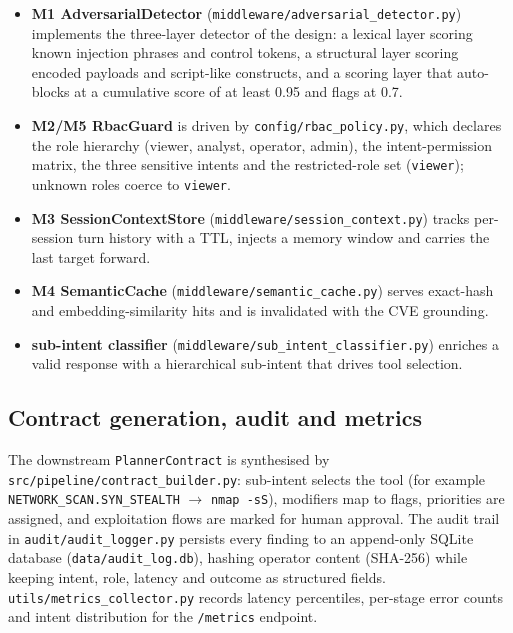 \begin{itemize}
\item \textbf{M1 AdversarialDetector}
(\texttt{middleware/adversarial\_detector.py}) implements the three-layer
detector of the design: a lexical layer scoring known injection phrases and
control tokens, a structural layer scoring encoded payloads and script-like
constructs, and a scoring layer that auto-blocks at a cumulative score of at
least 0.95 and flags at 0.7.
\item \textbf{M2/M5 RbacGuard} is driven by \texttt{config/rbac\_policy.py},
which declares the role hierarchy (viewer, analyst, operator, admin), the
intent-permission matrix, the three sensitive intents and the restricted-role
set (\texttt{viewer}); unknown roles coerce to \texttt{viewer}.
\item \textbf{M3 SessionContextStore}
(\texttt{middleware/session\_context.py}) tracks per-session turn history with
a TTL, injects a memory window and carries the last target forward.
\item \textbf{M4 SemanticCache} (\texttt{middleware/semantic\_cache.py}) serves
exact-hash and embedding-similarity hits and is invalidated with the CVE
grounding.
\item \textbf{sub-intent classifier}
(\texttt{middleware/sub\_intent\_classifier.py}) enriches a valid response with
a hierarchical sub-intent that drives tool selection.
\end{itemize}

\subsection*{Contract generation, audit and metrics}

\begin{sloppypar}
The downstream \texttt{PlannerContract} is synthesised by
\texttt{src/pipeline/contract\_builder.py}: sub-intent selects the tool (for
example \texttt{NETWORK\_SCAN.SYN\_STEALTH} $\rightarrow$ \texttt{nmap -sS}),
modifiers map to flags, priorities are assigned, and exploitation flows are
marked for human approval. The audit trail in
\texttt{audit/}\hspace{0pt}\texttt{audit\_logger.py} persists every finding to
an append-only SQLite database (\texttt{data/audit\_log.db}), hashing operator
content (SHA-256) while keeping intent, role, latency and outcome as
structured fields. \texttt{utils/}\hspace{0pt}\texttt{metrics\_collector.py}
records latency percentiles, per-stage error counts and intent distribution
for the \texttt{/metrics} endpoint.
\end{sloppypar}


